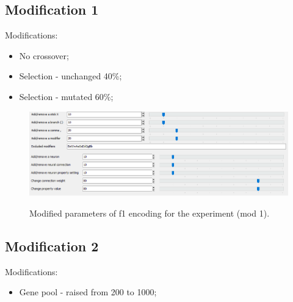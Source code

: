 \documentclass[a4]{article}
\begin{document}
\subsection{Modification 1}
Modifications:
\begin{itemize}
	\item No crossover;
	\item Selection - unchanged 40\%;
	\item Selection - mutated 60\%;
\end{itemize}
\begin{figure}[H]
	\includegraphics[scale=0.5]{f1params-mod }
	\label{fig:paramsmod1}
	\caption{Modified parameters of f1 encoding for the experiment (mod 1).}
\end{figure}
\subsection{Modification 2}
Modifications:
\begin{itemize}
	\item Gene pool - raised from 200 to 1000;
\end{itemize}
\end{document}
